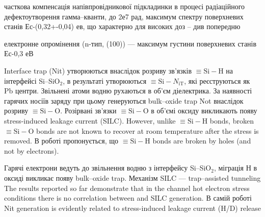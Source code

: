 \documentclass[a4paper,14pt,oneside,openany]{memoir}
\begin{document}
\cite{ParchSiO2}
часткова компенсація напівпровідникової підкладинки в процесі радіаційного дефектоутворення
гамма--кванти, до 2е7 рад, максимум спектру поверхневих станів Ес-(0,32+-0,04) ев, що характерно для високих доз -- див попередню

електронне опромінення (n-тип, (100)) --- максимум густини поверхневих станів Ес-0,3 еВ \cite{LaiSiO2}



Interface trap (Nit) утворюються внаслідок розриву зв'язків $\equiv\!\text{Si}\!-\!\text{H}$ на інтерфейсі Si--SiO$_2$,
в результаті утворюються $\equiv\text{Si}-N_\text{iT}$, які реєструються як Pb центри.
Звільнені атоми водню рухаються в об'єм діелектрика.
За наявності гарячих носіїв заряду при цьому генеруються bulk--oxide trap Not внаслідок розриву $\equiv\!\text{Si}\!-\!\text{O}$.
Розірвані зв'язки $\equiv\!\text{Si}\!-\!\text{O}$ в об'ємі оксиду викликають появу stress-induced leakage current (SILC).
However, unlike $\equiv\!\text{Si}\!-\!\text{H}$  bonds, broken $\equiv\!\text{Si}\!-\!\text{O}$ bonds are not known to recover
at room temperature after the stress is removed.
В роботі пропонується, що $\equiv\!\text{Si}\!-\!\text{H}$ bonds are broken by holes (and not by electrons). \cite{SiO2:Mahapatra}


Гарячі електрони ведуть до звільнення водню з інтерфейсу Si--SiO$_2$,  міграція Н в оксиді викликає появу bulk--oxide trap.
Механізм SILC --- trap--assisted tunneling
The results reported so far demonstrate that in the channel hot electron stress conditions there is no correlation between and SILC generation.
В самій роботі Nit generation is evidently related to stress-induced leakage current (H/D) release \cite{SiO2:Esseni}
\end{document}
